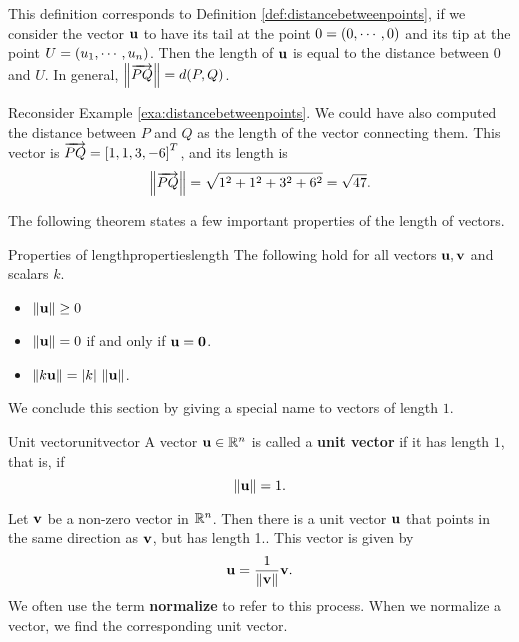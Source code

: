 This definition corresponds to Definition
\ref{def:distancebetweenpoints}, if we consider the vector $\mbox{\bf u}$
to have its tail at the point $0 = \left(0, \cdots ,0 \right)$ and its tip at
the point $U = \left(u_1, \cdots, u_n \right)$.  Then the length of
$\mbox{\bf u}$ is equal to the distance between $0$ and $U$. In general,
$\left\|\overrightarrow{PQ}\right\| = d(P,Q)$.

Reconsider Example \ref{exa:distancebetweenpoints}. We could have also
computed the distance between $P$ and $Q$ as the length of the vector
connecting them. This vector is $\overrightarrow{PQ} = \left[1,1,3,-6\right]^T$,
and its length is
\[
  \left\|\overrightarrow{PQ}\right\| = \sqrt{1^2+1^2+3^2+6^2} = \sqrt{47}.
\]

The following theorem states a few important properties of the length
of vectors.

\begin{theorem}{Properties of length}{propertieslength}
  The following hold for all vectors $\mbox{\bf u},\mbox{\bf v}$ and scalars $k$.
  \begin{itemize}
  \item $\left\|\mbox{\bf u}\right\|\geq 0$
  \item $\left\|\mbox{\bf u}\right\|=0$ if and only if $\mbox{\bf u}=\mbox{\bf 0}$.
  \item $\left\|k\mbox{\bf u}\right\| = |k|\,\left\|\mbox{\bf u}\right\|$.
  \end{itemize}
\end{theorem}

We conclude this section by giving a special name to vectors of length
$1$.

\begin{definition}{Unit vector}{unitvector}
  A vector\/ $\mbox{\bf u}\in\mathbb{R}^n$ is called a
  \textbf{unit vector} if it has
  length $1$, that is, if
  \begin{equation*}
    \left\|\mbox{\bf u}\right\| = 1.
  \end{equation*}
\end{definition}

Let $\mbox{\bf v}$ be a non-zero vector in $\mathbb{R}^{n}$. Then there is a unit
vector $\mbox{\bf u}$ that points in the same direction as $\mbox{\bf v}$, but
has length 1.. This vector is
given by
\begin{equation*}
\mbox{\bf u} = \frac{1}{\left\|\mbox{\bf v}\right\|} \mbox{\bf v}.
\end{equation*}
We often use the term \textbf{normalize} to refer
to this process. When we normalize a vector, we find the corresponding
unit vector.

